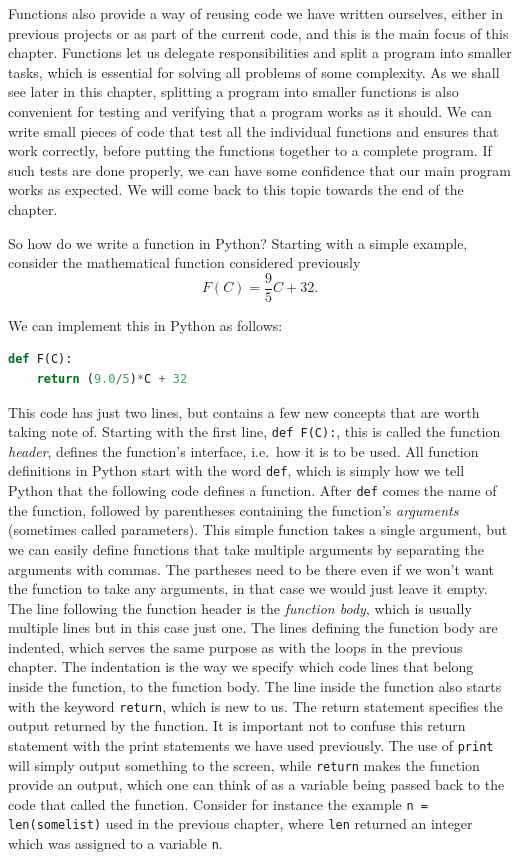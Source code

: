 \documentclass[graybox,envcountchap,sectrefs,final]{svmonodo}
\begin{document}
Functions also provide a way of reusing code we have written ourselves, either in
previous projects or as part of the current code, and this is the main focus of this chapter.
Functions let us delegate responsibilities and split a program into smaller tasks, which
is essential for solving all problems of some complexity. As we shall see later in this chapter,
splitting a program into smaller functions is also convenient for testing and verifying that a program works
as it should. We can write small pieces of code that test all the individual functions and ensures
that work correctly, before putting the functions together to a complete program. If such tests are done properly,
we can have some confidence that our main program works as expected. We will come back to this topic towards
the end of the chapter.

So how do we write a function in Python? Starting with a simple example, consider the mathematical function
considered previously
\[ F(C)=\frac{9}{5}C+32 .\]

We can implement this in Python as follows:
\begin{lstlisting}[language=Python,style=blue1]
def F(C):
    return (9.0/5)*C + 32
\end{lstlisting}
This code has just two lines, but contains a few new concepts that are worth taking note of. Starting with the first
line, \texttt{def F(C):}, this is called the function \emph{header}, defines the function's interface, i.e.~how it is to be used.
All function definitions in Python start with the word \texttt{def}, which is simply how we tell Python that the following
code defines a function. After \texttt{def} comes the name of the function, followed by parentheses containing the
function's \emph{arguments} (sometimes called parameters). This simple function takes a single argument, but we can easily define
functions that take multiple arguments by separating the arguments with commas. The partheses need to be there even if we
won't want the function to take any arguments, in that case we would just leave it empty.
The line following the function header is the \emph{function body}, which is usually multiple lines but in this case just one.
The lines defining the function body are indented, which serves the same purpose as with the loops in the previous chapter.
The indentation is the way we specify
which code lines that belong inside the function, to the function body. The line inside the function also starts
with the keyword \texttt{return}, which is new to us. The return statement specifies the output returned by the function.
It is important not to confuse this return statement
with the print statements we have used previously. The use of \texttt{print} will simply output something
to the screen, while \texttt{return} makes the function provide an output, which one can
think of as a variable being passed back to the code that called the function. Consider for instance the example \texttt{n = len(somelist)}
used in the previous chapter, where \texttt{len} returned an integer which was assigned to a variable \texttt{n}.
\end{document}
